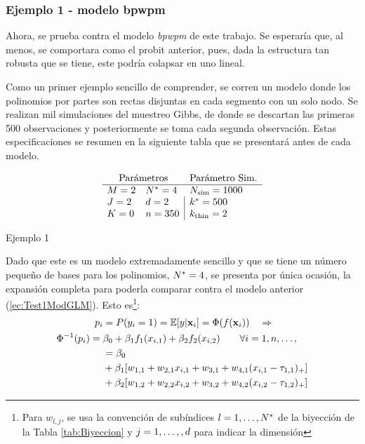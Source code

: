 \documentclass[../Main/Main.tex]{subfiles}
\begin{document}
\subsubsection*{Ejemplo 1 - modelo bpwpm} \label{sec:Test1Ej1}
Ahora, se prueba contra el modelo \textit{bpwpm} de este trabajo. Se esperaría que, al menos, se comportara como el probit anterior, pues, dada la estructura tan robusta que se tiene, este podría colapsar en uno lineal. 

Como un primer ejemplo sencillo de comprender, se corren un modelo donde los polinomios por partes son rectas disjuntas en cada segmento con un solo nodo. Se realizan mil simulaciones del muestreo Gibbs, de donde se descartan las primeras 500 observaciones y posteriormente se toma cada segunda observación. Estas especificaciones se resumen en la siguiente tabla que se presentará antes de cada modelo. 
\begin{table}[H]
$$\paramsmod{2}{2}{0}{4}{2}{350}{1000}{500}{2}$$
\caption*{Ejemplo 1}
\label{ej:1}
\end{table}
Dado que este es un modelo extremadamente sencillo y que se tiene un número pequeño de bases para los polinomios, $N^* = 4$, se presenta por única ocasión, la expansión completa para poderla comparar contra el modelo anterior (\ref{ec:Test1ModGLM}). Esto es\footnote{Para $w_{l,j}$, se usa la convención de subíndices $l = 1,\ldots,N^*$ de la biyección de la Tabla \ref{tab:Biyeccion} y $j = 1,\ldots,,{d}$ para indicar la dimensión}: 
\begin{align}
	p_i &= P(y_i = 1) =\mathbb{E}[y|\mathbf{x}_i] = \Phi(f(\mathbf{x}_i))  \quad \Rightarrow  			\nonumber \\
	\Phi^{-1}(p_i) = \;&\beta_0 + \beta_1f_1(x_{i,1}) + \beta_2f_2(x_{i,2}) 
	\qquad 	\forall i = 1,n,\ldots,\label{ec:Test1Ej1} \\
	&= \beta_0 \nonumber \\
	&+ \beta_1[w_{1,1} + w_{2,1}x_{i,1} + w_{3,1} + w_{4,1}(x_{i,1} - \tau_{1,1})_+] \label{ec:Test1Ej1F1}\\
	& +\beta_2[w_{1,2} + w_{2,2}x_{i,2} + w_{3,2} + w_{4,2}(x_{i,2} - \tau_{1,2})_+] \label{ec:Test1Ej1F2}
\end{align}
\end{document}
